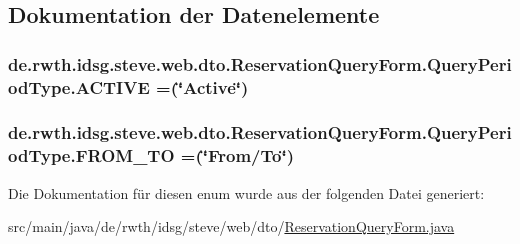 \subsection{Dokumentation der Datenelemente}
\hypertarget{enumde_1_1rwth_1_1idsg_1_1steve_1_1web_1_1dto_1_1_reservation_query_form_1_1_query_period_type_a775d5731727cbdda2f9cba8b51a4ca5a}{
\subsubsection[{A\+C\+T\+I\+V\+E}]{\setlength{\rightskip}{0pt plus 5cm}de.\+rwth.\+idsg.\+steve.\+web.\+dto.\+Reservation\+Query\+Form.\+Query\+Period\+Type.\+A\+C\+T\+I\+V\+E =(\char`\"{}Active\char`\"{})}}\label{enumde_1_1rwth_1_1idsg_1_1steve_1_1web_1_1dto_1_1_reservation_query_form_1_1_query_period_type_a775d5731727cbdda2f9cba8b51a4ca5a}
\hypertarget{enumde_1_1rwth_1_1idsg_1_1steve_1_1web_1_1dto_1_1_reservation_query_form_1_1_query_period_type_a44ca90614a7a7c041d770c226171a9e7}{
\subsubsection[{F\+R\+O\+M\+\_\+\+T\+O}]{\setlength{\rightskip}{0pt plus 5cm}de.\+rwth.\+idsg.\+steve.\+web.\+dto.\+Reservation\+Query\+Form.\+Query\+Period\+Type.\+F\+R\+O\+M\+\_\+\+T\+O =(\char`\"{}From/To\char`\"{})}}\label{enumde_1_1rwth_1_1idsg_1_1steve_1_1web_1_1dto_1_1_reservation_query_form_1_1_query_period_type_a44ca90614a7a7c041d770c226171a9e7}


Die Dokumentation für diesen enum wurde aus der folgenden Datei generiert\+:\begin{DoxyCompactItemize}
\item 
src/main/java/de/rwth/idsg/steve/web/dto/\hyperlink{_reservation_query_form_8java}{Reservation\+Query\+Form.\+java}\end{DoxyCompactItemize}
